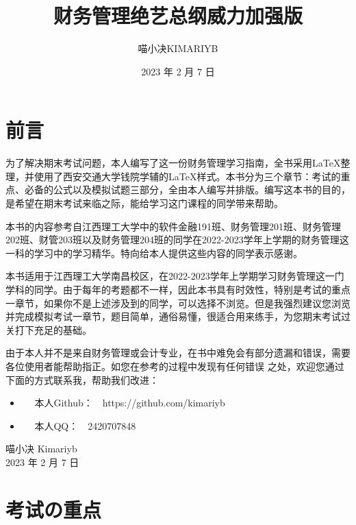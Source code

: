 \documentclass[
  10pt,
  twoside,
  openany,
  b5paper, %
  colorscheme = black, %
  xits = false,
]{qyxf-book}
\title{财务管理绝艺总纲威力加强版}
\subtitle{}  %
\author{喵小决KIMARIYB}
\date{2023 年 2 月 7 日}
\begin{document}
\maketitle
\tableofcontents

\chapter*{前言}

为了解决期末考试问题，本人编写了这一份财务管理学习指南，全书采用\LaTeX 整理，并使用了西安交通大学钱院学辅的\LaTeX 样式。本书分为三个章节：考试的重点、必备的公式以及模拟试题三部分，全由本人编写并排版。编写这本书的目的，是希望在期末考试来临之际，能给学习这门课程的同学带来帮助。

本书的内容参考自江西理工大学中的软件金融191班、财务管理201班、财务管理202班、财管203班以及财务管理204班的同学在2022-2023学年上学期的财务管理这一科的学习中的学习精华。特向给本人提供这些内容的同学表示感谢。

本书适用于江西理工大学南昌校区，在2022-2023学年上学期学习财务管理这一门学科的同学。由于每年的考题都不一样，因此本书具有时效性，特别是考试的重点一章节，如果你不是上述涉及到的同学，可以选择不浏览。但是我强烈建议您浏览并完成模拟考试一章节，题目简单，通俗易懂，很适合用来练手，为您期末考试过关打下充足的基础。

由于本人并不是来自财务管理或会计专业，在书中难免会有部分遗漏和错误，需要各位使用者能帮助指正。如您在参考的过程中发现有任何错误
之处，欢迎您通过下面的方式联系我，帮助我们改进：
\begin{itemize}
	\item \faGithub ~~ 本人Github：~~https://github.com/kimariyb
	\item \faQq ~~ 本人QQ：~~2420707848
\end{itemize}

\begin{flushright}
	喵小决 Kimariyb \\
	2023 年 2 月 7 日
\end{flushright}

\chapter{考试の重点}
\end{document}
